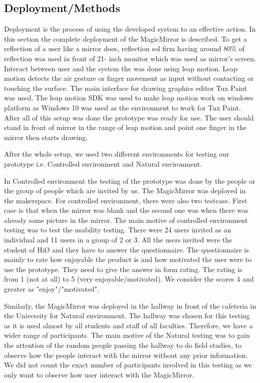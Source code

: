 \subsection{Deployment/Methods}
Deployment is the process of using the developed system to an effective action. In this section the complete deployment of the MagicMirror is described. To get a reflection of a user like a mirror does, reflection sol firm having around 80\% of reflection was used in front of 21- inch monitor which was used as mirror’s screen. Interact between user and the system the was done using leap motion. Leap motion detects the air gesture or finger movement as input without contacting or touching the surface. The main interface for drawing graphics editor Tux Paint was used. The leap motion SDK was used to make leap motion work on windows platform as Windows 10 was used as the environment to work for Tux Paint. After all of this setup was done the prototype was ready for use. The user should stand in front of mirror in the range of leap motion and point one finger in the mirror then starts drawing.

After the whole setup, we used two different environments for testing our prototype i.e. Controlled environment and Natural environment.

In Controlled environment the testing of the prototype was done by the people or the group of people which are invited by us. The MagicMirror was deployed in the makerspace. For controlled environment, there were also two testcase. First case is that when the mirror was blank and the second one was when there was already some picture in the mirror. The main motive of controlled environment testing was to test the usability testing. There were 24 users invited as an individual and 11 users in a group of 2 or 3. All the users invited were the student of HiØ and they have to answer the questionnaire. The questionnaire is mainly to rate how enjoyable the product is and how motivated the user were to use the prototype. They need to give the answer in form rating. The rating is from 1 (not at all) to 5 (very enjoyable/motivated). We consider the scores 4 and greater as "enjoy"/"motivated".
 
Similarly, the MagicMirror was deployed in the hallway in front of the cafeteria in the University for Natural environment. The hallway was chosen for this testing as it is used almost by all students and staff of all faculties. Therefore, we have a wider range of participants. The main motive of the Natural testing was to gain the attention of the random people passing the hallway to do field studies, to observe how the people interact with the mirror without any prior information. We did not count the exact number of participants involved in this testing as we only want to observe how user interact with the MagicMirror.
